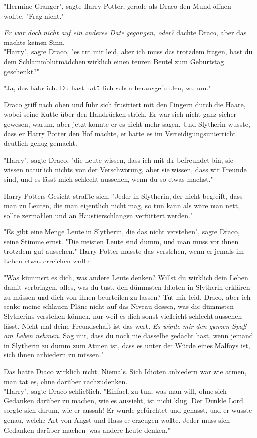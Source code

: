{"Hermine Granger", sagte Harry Potter, gerade als Draco den Mund öffnen wollte. "Frag nicht."

\emph{Er war doch nicht auf ein anderes Date gegangen, oder?} dachte Draco, aber das machte keinen Sinn.\\ "Harry", sagte Draco, "es tut mir leid, aber ich muss das trotzdem fragen, hast du dem Schlammblutmädchen wirklich einen teuren Beutel zum Geburtstag geschenkt?"

"Ja, das habe ich. Du hast natürlich schon herausgefunden, warum."

Draco griff nach oben und fuhr sich frustriert mit den Fingern durch die Haare, wobei seine Kutte über den Handrücken strich. Er war sich nicht ganz sicher gewesen, warum, aber jetzt konnte er es nicht mehr sagen. Und Slytherin wusste, dass er Harry Potter den Hof machte, er hatte es im Verteidigungsunterricht deutlich genug gemacht.

"Harry", sagte Draco, "die Leute wissen, dass ich mit dir befreundet bin, sie wissen natürlich nichts von der Verschwörung, aber sie wissen, dass wir Freunde sind, und es lässt mich schlecht aussehen, wenn du so etwas machst."

Harry Potters Gesicht straffte sich. "Jeder in Slytherin, der nicht begreift, dass man zu Leuten, die man eigentlich nicht mag, so tun kann als wäre man nett, sollte zermahlen und an Haustierschlangen verfüttert werden."

"Es gibt eine Menge Leute in Slytherin, die das nicht verstehen", sagte Draco, seine Stimme ernst. "Die meisten Leute sind dumm, und man muss vor ihnen trotzdem gut aussehen." Harry Potter musste das verstehen, wenn er jemals im Leben etwas erreichen wollte.

"Was kümmert es dich, was andere Leute denken? Willst du wirklich dein Leben damit verbringen, alles, was du tust, den dümmsten Idioten in Slytherin erklären zu müssen und dich von ihnen beurteilen zu lassen? Tut mir leid, Draco, aber ich senke meine schlauen Pläne nicht auf das Niveau dessen, was die dümmsten Slytherins verstehen können, nur weil es dich sonst vielleicht schlecht aussehen lässt. Nicht mal deine Freundschaft ist das wert. \emph{Es würde mir den ganzen Spaß am Leben nehmen.} Sag mir, dass du noch nie dasselbe gedacht hast, wenn jemand in Slytherin zu dumm zum Atmen ist, dass es unter der Würde eines Malfoys ist, sich ihnen anbiedern zu müssen."

Das hatte Draco wirklich nicht. Niemals. Sich Idioten anbiedern war wie atmen, man tat es, ohne darüber nachzudenken.\\ "Harry", sagte Draco schließlich. "Einfach zu tun, was man will, ohne sich Gedanken darüber zu machen, wie es aussieht, ist nicht klug. Der Dunkle Lord sorgte sich darum, wie er aussah! Er wurde gefürchtet und gehasst, und er wusste genau, welche Art von Angst und Hass er erzeugen wollte. Jeder muss sich Gedanken darüber machen, was andere Leute denken."

}
